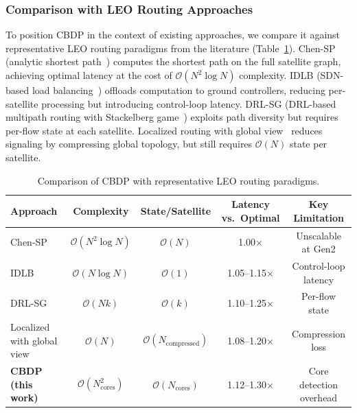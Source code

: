\documentclass[sn-nature,pdflatex]{sn-jnl}
\begin{document}
\subsubsection{Comparison with LEO Routing Approaches}

To position CBDP in the context of existing approaches, we compare it against representative LEO routing paradigms from the literature (Table~\ref{tab:routing_comparison}).
Chen-SP (analytic shortest path~\cite{chen_2024_jsac}) computes the shortest path on the full satellite graph, achieving optimal latency at the cost of $\mathcal{O}(N^2\log N)$ complexity.
IDLB (SDN-based load balancing~\cite{roth_2025_idlb,papa_2020}) offloads computation to ground controllers, reducing per-satellite processing but introducing control-loop latency.
DRL-SG (DRL-based multipath routing with Stackelberg game~\cite{li_2025_tmc}) exploits path diversity but requires per-flow state at each satellite.
Localized routing with global view~\cite{yan_2024_galor} reduces signaling by compressing global topology, but still requires $\mathcal{O}(N)$ state per satellite.

\begin{table}[htbp]
\centering
\caption{Comparison of CBDP with representative LEO routing paradigms.}
\label{tab:routing_comparison}
\begin{tabular}{lcccc}
\toprule
Approach & Complexity & State/Satellite & Latency vs.\ Optimal & Key Limitation \\
\midrule
Chen-SP~\cite{chen_2024_jsac} & $\mathcal{O}(N^2\log N)$ & $\mathcal{O}(N)$ & 1.00$\times$ & Unscalable at Gen2 \\
IDLB~\cite{roth_2025_idlb} & $\mathcal{O}(N\log N)$ & $\mathcal{O}(1)$ & 1.05--1.15$\times$ & Control-loop latency \\
DRL-SG~\cite{li_2025_tmc} & $\mathcal{O}(Nk)$ & $\mathcal{O}(k)$ & 1.10--1.25$\times$ & Per-flow state \\
Localized with global view~\cite{yan_2024_galor} & $\mathcal{O}(N)$ & $\mathcal{O}(N_{\text{compressed}})$ & 1.08--1.20$\times$ & Compression loss \\
\textbf{CBDP (this work)} & $\mathcal{O}(N_{\text{cores}}^2)$ & $\mathcal{O}(N_{\text{cores}})$ & 1.12--1.30$\times$ & Core detection overhead \\
\bottomrule
\end{tabular}
\end{table}
\end{document}
